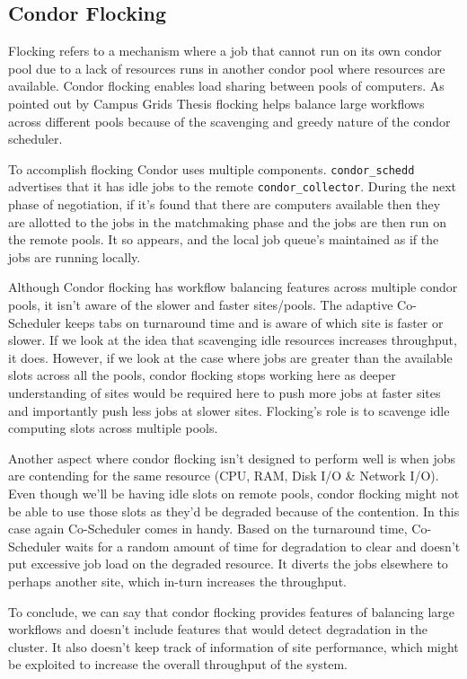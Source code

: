 \documentclass[ms,electronic,double]{nuthesis}
\begin{document}
\subsection{Condor Flocking}
Flocking refers to a mechanism where a job that cannot run on its own condor pool 
due to a lack of resources runs in another condor pool where resources are 
available. Condor flocking enables load sharing between pools of computers. As 
pointed out by Campus Grids Thesis\cite{derekThesis} flocking helps balance large workflows across different pools because of the scavenging and greedy nature 
of the condor scheduler.

To accomplish flocking Condor uses multiple components. 
\texttt{condor\_schedd} advertises that it has idle jobs to the remote \texttt{condor\_collector}. During the next phase of negotiation, if it's found that there are computers 
available then they are allotted to the jobs in the matchmaking phase and the 
jobs are then run on the remote pools. It so appears, and the local job queue's maintained as if 
the jobs are running locally. 

Although Condor flocking has workflow balancing features across multiple condor 
pools, it isn't aware of the slower and faster sites/pools. The adaptive Co-Scheduler 
keeps tabs on turnaround time and is aware of which site is faster or slower. If we 
look at the idea that scavenging idle resources increases throughput, it does. However, if we look at the case where jobs are greater than the available slots 
across all the pools, condor flocking stops working here as deeper understanding of sites
would be required here to push more jobs at faster sites and importantly push less jobs
at slower sites. Flocking's role is to scavenge idle computing slots across multiple pools. 

Another aspect where condor flocking isn't designed to perform well is when jobs are 
contending for the same resource (CPU, RAM, Disk I/O \& Network I/O). Even though we'll be 
having idle slots on remote pools, condor flocking might not be able to use those 
slots as they'd be degraded because of the contention. In this case again 
Co-Scheduler comes in handy. Based on the turnaround time, Co-Scheduler waits for a random 
amount of time for degradation to clear and doesn't put excessive job load on the 
degraded resource. It diverts the jobs elsewhere to perhaps another site, which in-turn increases the 
throughput.

To conclude, we can say that condor flocking provides features of balancing 
large workflows and doesn't include features that would detect degradation in 
the cluster. It also doesn't keep track of information of site performance, which might be exploited to increase the overall throughput of the system. 
\end{document}
